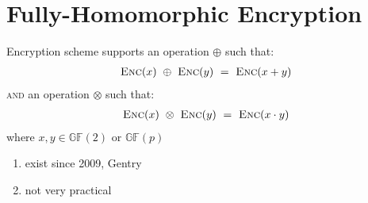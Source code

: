 \documentclass{report}
\begin{document}
\section{Fully-Homomorphic Encryption}
\begin{adjustwidth}{2em}{2em}
	Encryption scheme supports an operation $\oplus$ such that:
	\begin{align*}
		\textsc{Enc}(x) \ \oplus \ \textsc{Enc}(y) \ = \ \textsc{Enc}(x + y)
	\end{align*}
	\textsc{and} an operation $\otimes$ such that:
	\begin{align*}
		\textsc{Enc}(x) \ \otimes \ \textsc{Enc}(y) \ = \ \textsc{Enc}(x \cdot y)
	\end{align*}
	where $x, y \in \mathbb{GF}(2)$ or $\mathbb{GF}(p)$
	\begin{enumerate}[$\rightarrow$]
		\item exist since 2009, Gentry
		\item not very practical
	\end{enumerate}
\end{adjustwidth}
\end{document}
